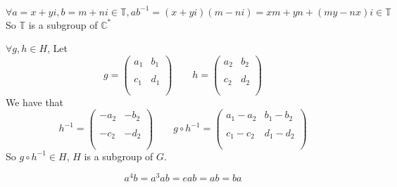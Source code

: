 \documentclass[a4paper, justified]{tufte-handout}
\begin{document}
\begin{problem}[TJ 3-39]
\end{problem}

\begin{solution}
\[
\forall a=x+yi, b=m+ni\in \mathbb{T}, ab^{-1}=(x+yi)(m-ni)=xm+yn+(my-nx)i\in \mathbb{T}
\]
So $\mathbb{T}$ is a subgroup of $\mathbb{C^*}$
\end{solution}

\begin{problem}[TJ 3-42]
\end{problem}

\begin{solution}
$\forall g,h\in H$, Let
\[
g=\begin{pmatrix}
    a_1 & b_1\\\\
    c_1 & d_1 \\\\
 \end{pmatrix}
\qquad h = \begin{pmatrix}
    a_2 & b_2 \\\\
    c_2 & d_2 \\\\
\end{pmatrix}
\]
We have that
\[
h^{-1}=  \begin{pmatrix}
    -a_2 & -b_2 \\\\
    -c_2 & -d_2 \\\\
\end{pmatrix}
\qquad g\circ h^{-1} = \begin{pmatrix}
    a_1-a_2 & b_1-b_2 \\\\
    c_1-c_2 & d_1-d_2 \\\\
\end{pmatrix}
\]
So $g\circ h^{-1}\in H$, $H$ is a subgroup of $G$.
\end{solution}

\begin{problem}[TJ 3-49]
\end{problem}

\begin{solution}
\[
a^4b=a^3ab=eab=ab=ba
\]
\end{solution}
\end{document}
